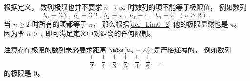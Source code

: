 \begin{example}{}
根据定义， 数列极限也并不要求 $n\to \infty$ 时数列的项不能等于极限值， 例如数列
\begin{equation}
b_0 = 3.3~,\,\, b_1 = 3.2~, \,\, b_2 = \pi~, \,\, b_3 = \pi~, \,\, b_n = \pi \;\; (n \ge 2)~.
\end{equation}
当 $n \ge 2$ 时所有的项都等于 $\pi$， 那么根据\autoref{def_Lim0_2} 他的极限显然也是 $\pi$。 因为令 $n > 1$ 即可满足定义中对距离的任何限制。
\end{example}

\begin{example}{}
注意存在极限的数列未必要求距离 $\abs{a_n - A}$ 是严格递减的， 例如数列
\begin{equation}
\frac{1}{2},\;\; \frac{1}{4},\;\; \frac{1}{3},\;\; \frac{1}{5},\;\; \frac{1}{4},\;\; \frac{1}{6},\;\; \dots~
\end{equation}
的极限是 $0$。
\end{example}

